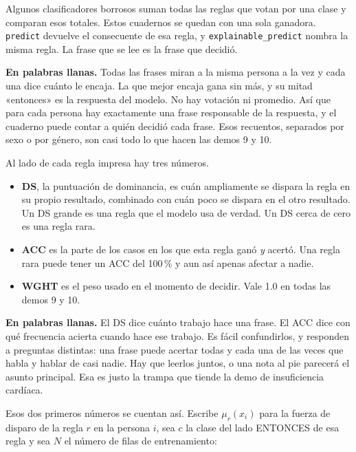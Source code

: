 \documentclass[11pt]{article}
\newcommand{\fn}[1]{\texttt{\small #1}}
\begin{document}
Algunos clasificadores borrosos suman todas las reglas que votan por una clase y comparan esos totales. Estos cuadernos se quedan con una sola ganadora. \fn{predict} devuelve el consecuente de esa regla, y \fn{explainable\_predict} nombra la misma regla. La frase que se lee es la frase que decidió.

\begin{plainwords}
\textbf{En palabras llanas.} Todas las frases miran a la misma persona a la vez y cada una dice cuánto le encaja. La que mejor encaja gana sin más, y su mitad «entonces» es la respuesta del modelo. No hay votación ni promedio. Así que para cada persona hay exactamente una frase responsable de la respuesta, y el cuaderno puede contar a quién decidió cada frase. Esos recuentos, separados por sexo o por género, son casi todo lo que hacen las demos 9 y 10.
\end{plainwords}

Al lado de cada regla impresa hay tres números.

\begin{itemize}
  \item \textbf{DS}, la puntuación de dominancia, es cuán ampliamente se dispara la regla en su propio resultado, combinado con cuán poco se dispara en el otro resultado. Un DS grande es una regla que el modelo usa de verdad. Un DS cerca de cero es una regla rara.
  \item \textbf{ACC} es la parte de los casos en los que esta regla ganó \emph{y} acertó. Una regla rara puede tener un ACC del 100\,\% y aun así apenas afectar a nadie.
  \item \textbf{WGHT} es el peso usado en el momento de decidir. Vale 1.0 en todas las demos 9 y 10.
\end{itemize}

\begin{plainwords}
\textbf{En palabras llanas.} El DS dice cuánto trabajo hace una frase. El ACC dice con qué frecuencia acierta cuando hace ese trabajo. Es fácil confundirlos, y responden a preguntas distintas: una frase puede acertar todas y cada una de las veces que habla y hablar de casi nadie. Hay que leerlos juntos, o una nota al pie parecerá el asunto principal. Esa es justo la trampa que tiende la demo de insuficiencia cardíaca.
\end{plainwords}

Esos dos primeros números se cuentan así. Escribe \(\mu_r(x_i)\) para la fuerza de disparo de la regla \(r\) en la persona \(i\), sea \(c\) la clase del lado ENTONCES de esa regla y sea \(N\) el número de filas de entrenamiento:
\end{document}
